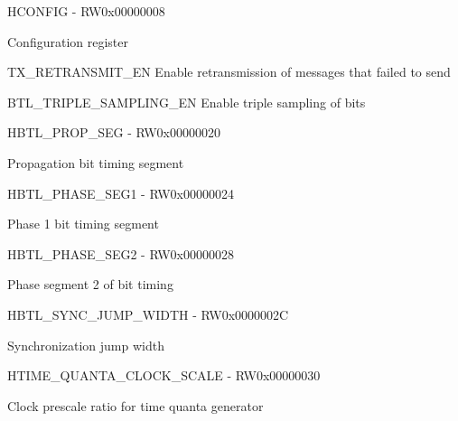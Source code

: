 \documentclass{article}
\begin{document}
\begin{register}{H}{CONFIG - RW}{0x00000008}  \par Configuration register \regnewline
  \label{CONFIG}
\regnewline
  \begin{regdesc}\begin{reglist}
    \item [TX{\_}RETRANSMIT{\_}EN] Enable retransmission of messages that failed to send    \item [BTL{\_}TRIPLE{\_}SAMPLING{\_}EN] Enable triple sampling of bits  \end{reglist}\end{regdesc}
\end{register}

\begin{register}{H}{BTL{\_}PROP{\_}SEG - RW}{0x00000020}  \par Propagation bit timing segment \regnewline
  \label{BTL_PROP_SEG}
\regnewline
\end{register}

\begin{register}{H}{BTL{\_}PHASE{\_}SEG1 - RW}{0x00000024}  \par Phase 1 bit timing segment \regnewline
  \label{BTL_PHASE_SEG1}
\regnewline
\end{register}

\begin{register}{H}{BTL{\_}PHASE{\_}SEG2 - RW}{0x00000028}  \par Phase segment 2 of bit timing \regnewline
  \label{BTL_PHASE_SEG2}
\regnewline
\end{register}

\begin{register}{H}{BTL{\_}SYNC{\_}JUMP{\_}WIDTH - RW}{0x0000002C}  \par Synchronization jump width \regnewline
  \label{BTL_SYNC_JUMP_WIDTH}
\regnewline
\end{register}

\begin{register}{H}{TIME{\_}QUANTA{\_}CLOCK{\_}SCALE - RW}{0x00000030}  \par Clock prescale ratio for time quanta generator \regnewline
  \label{TIME_QUANTA_CLOCK_SCALE}
\regnewline
\end{register}
\end{document}
